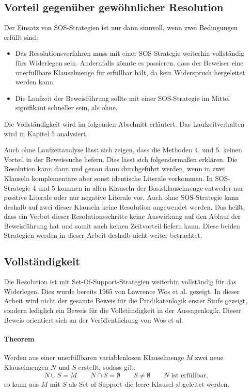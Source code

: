 \subsection{Vorteil gegenüber gewöhnlicher Resolution}
Der Einsatz von SOS-Strategien ist nur dann sinnvoll, wenn zwei Bedingungen erfüllt sind:
\begin{itemize}
	\item Das Resolutionsverfahren muss mit einer SOS-Strategie weiterhin vollständig fürs Widerlegen sein. Andernfalls könnte es passieren, dass der Beweiser eine unerfüllbare Klauselmenge für erfüllbar hält, da kein Widerspruch hergeleitet werden kann.
	\item Die Laufzeit der Beweisführung sollte mit einer SOS-Strategie im Mittel signifikant schneller sein, als ohne.

\end{itemize}
Die Vollständigkeit wird im folgenden Abschnitt erläutert. Das Laufzeitverhalten wird in Kapitel 5 analysiert.

Auch ohne Laufzeitanalyse lässt sich zeigen, dass die Methoden 4. und 5. keinen Vorteil in der Beweissuche liefern. Dies lässt sich folgendermaßen erklären. Die Resolution kann dann und genau dann durchgeführt werden, wenn in zwei Klauseln komplementäre aber sonst identische Literale vorkommen. In SOS-Strategie 4 und 5 kommen in allen Klauseln der Basisklauselmenge entweder nur positive Literale oder nur negative Literale vor. Auch ohne SOS-Strategie kann deshalb auf zwei dieser Klauseln keine Resolution angewendet werden. Das heißt, dass ein Verbot dieser Resolutionsschritte keine Auswirkung auf den Ablauf der Beweisführung hat und somit auch keinen Zeitvorteil liefern kann. Diese beiden Strategien werden in dieser Arbeit deshalb nicht weiter betrachtet.

		\subsection{Vollständigkeit}		
Die Resolution ist mit Set-Of-Support-Strategien weiterhin vollständig für das Widerlegen. Dies wurde bereits 1965 von Lawrence Wos et al. gezeigt. In dieser Arbeit wird nicht der gesamte Beweis für die Prädikatenlogik erster Stufe gezeigt, sondern lediglich ein Beweis für die Vollständigkeit in der Aussagenlogik. Dieser Beweis orientiert sich an der Veröffentlichung von Wos et al. \cite{Wos1965Sos}

\paragraph{Theorem} Werden aus einer unerfüllbaren variablenlosen Klauselmenge $M$ zwei neue Klauselmengen $N$ und $S$ erstellt, sodass gilt: 
$$N \cup S = M \quad\quad N \cap S = \emptyset \quad\quad S \neq \emptyset \quad\quad N \text{ ist erfüllbar,}$$
so kann aus $M$ mit $S$ als Set of Support die leere Klausel abgeleitet werden.


